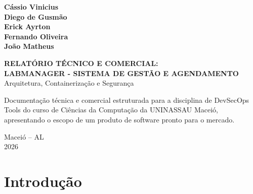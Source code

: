 \documentclass[12pt,a4paper]{article}
\begin{document}
	\begin{titlepage}
		
		\begin{center}
			
			{\large \textbf{Cássio Vinicius}}\\
			{\large \textbf{Diego de Gusmão}}\\
			{\large \textbf{Erick Ayrton}}\\
			{\large \textbf{Fernando Oliveira}}\\
			{\large \textbf{João Matheus}}
			
			\vfill
			
			{\large \textbf{RELATÓRIO TÉCNICO E COMERCIAL:}\\[0.2cm]
				\textbf{LABMANAGER - SISTEMA DE GESTÃO E AGENDAMENTO}\\[0.3cm]
				Arquitetura, Containerização e Segurança}
			
			\vfill
			
			\begin{flushright}
				
				\begin{minipage}{0.5\textwidth}
					
					Documentação técnica e comercial estruturada para a disciplina de DevSecOps Tools do curso de Ciências da Computação da UNINASSAU Maceió, apresentando o escopo de um produto de software pronto para o mercado.
					
				\end{minipage}
				
			\end{flushright}
			
			\vfill
			
			Maceió -- AL\\
			2026
			
		\end{center}
		
	\end{titlepage}
	
	
	\tableofcontents
	
	\newpage
	
	
	\section{Introdução}
	
\end{document}
